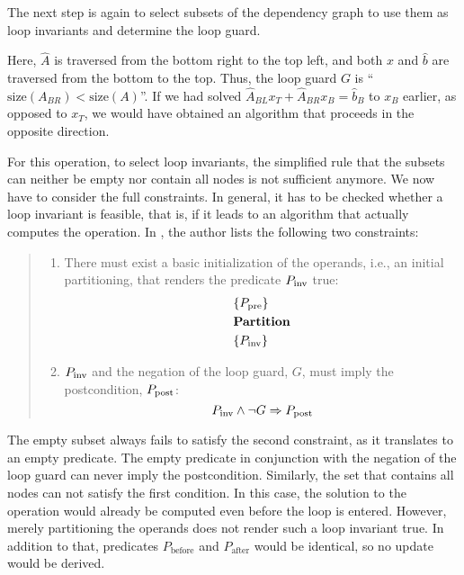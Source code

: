 %
The next step is again to select subsets of the dependency graph to use them as loop invariants and determine the loop guard.

Here, $\hat{A}$ is traversed from the bottom right to the top left, and both $x$ and $\hat{b}$ are traversed from the bottom to the top. Thus, the loop guard $G$ is ``$\text{size}(A_{BR}) < \text{size}(A)$''. If we had solved $\hat{A}_{BL} x_T + \hat{A}_{BR} x_B = \hat{b}_B$ to $x_B$ earlier, as opposed to $x_T$, we would have obtained an algorithm that proceeds in the opposite direction.

For this operation, to select loop invariants, the simplified rule that the subsets can neither be empty nor contain all nodes is not sufficient anymore. We now have to consider the full constraints. In general, it has to be checked whether a loop invariant is feasible, that is, if it leads to an algorithm that actually computes the operation. In \cite{Fabregat-Traver:thesis}, the author lists the following two constraints:
%
\begin{quote}
\itshape
\begin{enumerate}
\item There must exist a basic initialization of the operands, i.e., an initial partitioning, that renders the predicate $P_\text{\textrm{inv}}$ true:
\begin{align*}
&\{P_\text{\textrm{pre}}\} \\
&\text{\textbf{Partition}} \\
&\{P_\text{\textrm{inv}}\}
\end{align*}
\item $P_\text{\textrm{inv}}$ and the negation of the loop guard, $G$, must imply the postcondition, $P_\text{\textrm{post}}$:
$$P_\text{\textrm{inv}} \land \neg G \Rightarrow P_\text{\textrm{post}}$$
\end{enumerate}
\end{quote}
\label{feasibilityConditions}
%
The empty subset always fails to satisfy the second constraint, as it translates to an empty predicate. The empty predicate in conjunction with the negation of the loop guard can never imply the postcondition. Similarly, the set that contains all nodes can not satisfy the first condition. In this case, the solution to the operation would already be computed even before the loop is entered. However, merely partitioning the operands does not render such a loop invariant true. In addition to that, predicates $P_\text{before}$ and $P_\text{after}$ would be identical, so no update would be derived.

